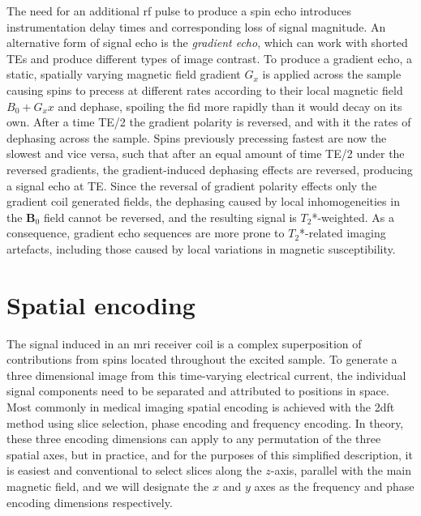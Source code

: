 The need for an additional \gls{rf} pulse to produce a spin echo introduces instrumentation delay times and corresponding loss of signal magnitude.
An alternative form of signal echo is the \textit{gradient echo}, which can work with shorted TEs and produce different types of image contrast.
To produce a gradient echo, a static, spatially varying magnetic field gradient $G_x$ is applied across the sample causing spins to precess at different rates according to their local magnetic field $B_0 + G_xx$ and dephase, spoiling the \gls{fid} more rapidly than it would decay on its own.
After a time TE/2 the gradient polarity is reversed, and with it the rates of dephasing across the sample.
Spins previously precessing fastest are now the slowest and vice versa, such that after an equal amount of time TE/2 under the reversed gradients, the gradient-induced dephasing effects are reversed, producing a signal echo at TE.
Since the reversal of gradient polarity effects only the gradient coil generated fields, the dephasing caused by local inhomogeneities in the $\mathbf{B}_0$ field cannot be reversed, and the resulting signal is $T_2$*-weighted.
As a consequence, gradient echo sequences are more prone to $T_2$*-related imaging artefacts, including those caused by local variations in magnetic susceptibility.

\section{Spatial encoding}

The signal induced in an \gls{mri} receiver coil is a complex superposition of contributions from spins located throughout the excited sample.
To generate a three dimensional image from this time-varying electrical current, the individual signal components need to be separated and attributed to positions in space.
Most commonly in medical imaging spatial encoding is achieved with the \gls{2dft} method using slice selection, phase encoding and frequency encoding\autocite{Hendee2002}.
In theory, these three encoding dimensions can apply to any permutation of the three spatial axes, but in practice, and for the purposes of this simplified description, it is easiest and conventional to select slices along the $z$-axis, parallel with the main magnetic field, and we will designate the $x$ and $y$ axes as the frequency and phase encoding dimensions respectively.

